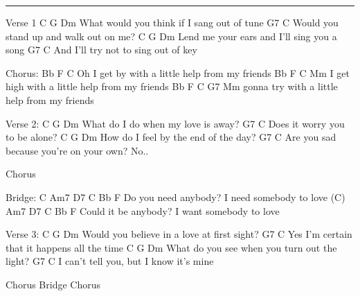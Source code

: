 \noindent\rule{\columnwidth}{1pt}
\begin{lstsong}
Verse 1
C              G          Dm
What would you think if I sang out of tune
                       G7          C
Would you stand up and walk out on me?
C            G             Dm
Lend me your ears and I'll sing you a song
                    G7          C
And I'll try not to sing out of key

Chorus:
         Bb               F            C
Oh I get by with a little help from my friends
         Bb                 F            C
Mm I get high with a little help from my friends
         Bb                F            C         G7
Mm gonna try with a little help from my friends

Verse 2:
C         G          Dm
What do I do when my love is away?
                  G7     C
Does it worry you to be alone?
C        G           Dm
How do I feel by the end of the day?
                           G7      C
Are you sad because you're on your own? No..

Chorus

Bridge:
C      Am7     D7      C        Bb      F
Do you need anybody? I need somebody to love
(C)      Am7   D7      C        Bb      F
Could it be anybody? I want somebody to love

Verse 3:
C           G          Dm
Would you believe in a love at first sight?
                        G7              C
Yes I'm certain that it happens all the time
C           G            Dm
What do you see when you turn out the light?
                        G7        C
I can't tell you, but I know it's mine

Chorus
Bridge
Chorus
\end{lstsong}
\newpage

\begin{comment}
Outro:
          Bb               F            C

Yes I get by with a little help from my friends
                           Bb       F         C
With a little help from my frieeeeeeeeeeds my friends.
\end{comment}


